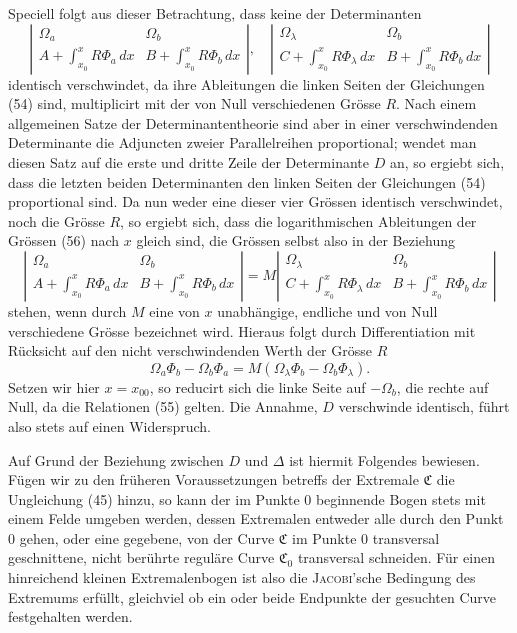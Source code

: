 \documentclass[11pt,a4paper,leqno]{article}
\begin{document}
Speciell folgt aus dieser Betrachtung, dass keine der Determinanten
\begin{equation}\tag{56}
\left|\begin{array}{cc}
\Omega_a&\Omega_b\\[.8ex]
A+\displaystyle\int_{x_0}^{x}R\Phi_a\,dx&B+\displaystyle\int_{x_0}^{x}R\Phi_b\,dx
\end{array}\right|,
\quad
\left|\begin{array}{cc}
\Omega_\lambda&\Omega_b\\[.8ex]
C+\displaystyle\int_{x_0}^{x}R\Phi_\lambda\,dx&B+\displaystyle\int_{x_0}^{x}R\Phi_b\,dx
\end{array}\right|
\end{equation}
identisch verschwindet, da ihre Ableitungen die linken Seiten der Gleichungen (54) sind, multiplicirt mit der von Null verschiedenen Grösse $R$. Nach einem allgemeinen Satze der Determinantentheorie sind aber in einer verschwindenden Determinante die Adjuncten zweier Parallelreihen proportional; wendet man diesen Satz auf die erste und dritte Zeile der Determinante $D$ an, so ergiebt sich, dass die letzten beiden Determinanten den linken Seiten der Gleichungen (54) proportional sind. Da nun weder eine dieser vier Grössen identisch verschwindet, noch die Grösse $R$, so ergiebt sich, dass die logarithmischen Ableitungen der Grössen (56) nach $x$ gleich sind, die Grössen selbst also in der Beziehung
\[
\left|\begin{array}{cc}
\Omega_a&\Omega_b\\[.8ex]
A+\displaystyle\int_{x_0}^{x}R\Phi_a\,dx&B+\displaystyle\int_{x_0}^{x}R\Phi_b\,dx
\end{array}\right|
=M
\left|\begin{array}{cc}
\Omega_\lambda&\Omega_b\\[.8ex]
C+\displaystyle\int_{x_0}^{x}R\Phi_\lambda\,dx&B+\displaystyle\int_{x_0}^{x}R\Phi_b\,dx
\end{array}\right|
\]
stehen, wenn durch $M$ eine von $x$ unabhängige, endliche und von Null verschiedene Grösse bezeichnet wird. Hieraus folgt durch Differentiation mit Rücksicht auf den nicht verschwindenden Werth der Grösse $R$
\[
\Omega_a\Phi_b-\Omega_b\Phi_a=M(\Omega_\lambda\Phi_b-\Omega_b\Phi_\lambda).
\]
Setzen wir hier $x=x_{00}$, so reducirt sich die linke Seite auf $-\Omega_b$, die rechte auf Null, da die Relationen (55) gelten. Die Annahme, $D$ verschwinde identisch, führt also stets auf einen Widerspruch.

Auf Grund der Beziehung zwischen $D$ und $\Delta$ ist hiermit Folgendes bewiesen. Fügen wir zu den früheren Voraussetzungen betreffs der Extremale $\mathfrak{C}$ die Ungleichung (45) hinzu, so kann der im Punkte 0 beginnende Bogen stets mit einem Felde umgeben werden, dessen Extremalen entweder alle durch den Punkt 0 gehen, oder eine gegebene, von der Curve $\mathfrak{C}$ im Punkte 0 transversal geschnittene, nicht berührte reguläre Curve $\mathfrak{C}_0$ transversal schneiden. Für einen hinreichend kleinen Extremalenbogen ist also die \textsc{Jacobi}'sche Bedingung des Extremums erfüllt, gleichviel ob ein oder beide Endpunkte der gesuchten Curve festgehalten werden.
\end{document}
